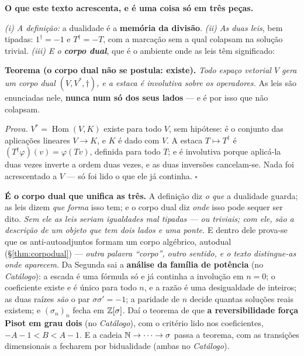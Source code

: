 \documentclass[livro.tex]{subfiles}
\begin{document}
\medskip
\noindent\textbf{O que este texto acrescenta, e é uma coisa só em três peças.}

\smallskip
\noindent\emph{(i) A definição:} a dualidade é a \textbf{memória da divisão}.
\emph{(ii) As duas leis}, bem tipadas: $1^{\dagger}=-1$ e $T^{\dagger}=-T$, com a marcação sem a
qual colapsam na solução trivial.
\emph{(iii) E o \textbf{corpo dual}}, que é o ambiente onde as leis têm significado:

\begin{center}\small
\begin{minipage}{0.92\textwidth}
\textbf{Teorema (o corpo dual não se postula: existe).} \emph{Todo espaço vetorial $V$ gera um
corpo dual $(V,V^{*},\dagger)$, e a estaca é involutiva sobre os operadores.} As leis são
enunciadas nele, \textbf{nunca num só dos seus lados} --- e é por isso que não colapsam.

\smallskip
\emph{Prova.} $V^{*}=\operatorname{Hom}(V,K)$ existe para todo $V$, sem hipótese: é o conjunto
das aplicações lineares $V\to K$, e $K$ é dado com $V$. A estaca $T\mapsto T^{\dagger}$ é
$(T^{\dagger}\varphi)(v)=\varphi(Tv)$, definida para todo $T$; e é involutiva porque aplicá-la
duas vezes inverte a ordem duas vezes, e as duas inversões cancelam-se. Nada foi acrescentado a
$V$ --- só foi lido o que ele já continha. $\square$
\end{minipage}
\end{center}

\noindent \textbf{É o corpo dual que unifica as três.} A definição diz \emph{o que} a dualidade
guarda; as leis dizem \emph{que forma} isso tem; e o corpo dual diz \emph{onde} isso pode sequer
ser dito. \emph{Sem ele as leis seriam igualdades mal tipadas --- ou triviais; com ele, são a
descrição de um objeto que tem dois lados e uma ponte.} E dentro dele prova-se que os
anti-autoadjuntos formam um corpo algébrico, autodual (\S\ref{thm:corpodual}) --- \emph{outra
palavra ``corpo'', outro sentido, e o texto distingue-as onde aparecem}. Da Segunda sai a \textbf{análise da família de
potência} (no \emph{Catálogo}): a escada é uma fórmula só e já continha a involução em $n=0$; o
coeficiente existe e é único para todo $n$, e a razão é uma desigualdade de inteiros; as duas raízes
\emph{são} o par $\sigma\sigma'=-1$; a paridade de $n$ decide quantas soluções reais existem; e
$(\sigma_n)_n$ fecha em $\mathbb Z[\sigma]$. Daí o teorema de que \textbf{a reversibilidade força Pisot em
grau dois} (no \emph{Catálogo}), com o critério lido nos coeficientes, $-A-1<B<A-1$. E a cadeia
$\mathbb{N}\to\dots\to\sigma$ passa a teorema, com as transições dimensionais a fecharem por bidualidade
(ambas no \emph{Catálogo}).
\end{document}
